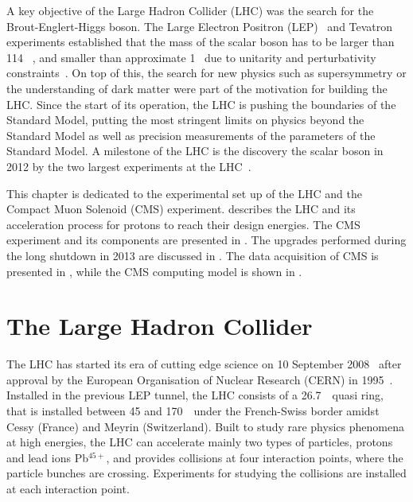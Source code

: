 
A key objective of the Large Hadron Collider (LHC) was the search for the Brout-Englert-Higgs boson. The Large  Electron Positron (LEP)~\cite{Myers:226776} and Tevatron~\cite{1748-0221-6-08-T08001} experiments established that the mass of the scalar boson has to be larger than 114 \GeV~\cite{Barate:2003sz,Herner:2016woc}, and smaller than approximate 1 \TeV\ due to unitarity and perturbativity constraints~\cite{Djouadi:2005gi}. On top of this, the search for new physics such as supersymmetry or the understanding of dark matter were part of the motivation for building the LHC. 
Since the start of its operation, the LHC is pushing the boundaries of the Standard Model, putting the most stringent limits on physics beyond the Standard Model as well as precision measurements of the parameters of the Standard Model. A milestone of the LHC is the discovery the scalar boson in 2012 by the two largest experiments at the LHC~\cite{Chatrchyan:2012xdj,Aad:2012tfa}.

This chapter is dedicated to the experimental set up of the LHC and the Compact  Muon Solenoid (CMS) experiment.  describes the LHC and its acceleration process for protons to reach their design energies. The CMS experiment and its components are presented in . The upgrades performed during the long shutdown in 2013 are discussed in . The data acquisition of CMS is presented in , while the CMS computing model is shown in .


\section{The Large Hadron Collider}
\label{sec:LHC}
The LHC has started its era of cutting edge science on 10 September 2008~\cite{LHC:2008} after approval by the European Organisation of Nuclear Research (CERN) in 1995~\cite{Pettersson:291782}. Installed in the previous LEP tunnel, the LHC consists of a 26.7~\km\ quasi ring, that is installed between 45 and 170~\m\ under the French-Swiss border amidst Cessy (France) and Meyrin (Switzerland). Built to study rare physics phenomena at high energies, the LHC  can accelerate mainly two types of particles, protons and lead ions Pb$^{45+}$, and provides collisions at four interaction points, where the particle bunches are crossing. Experiments for studying the collisions are installed at each interaction point. 

